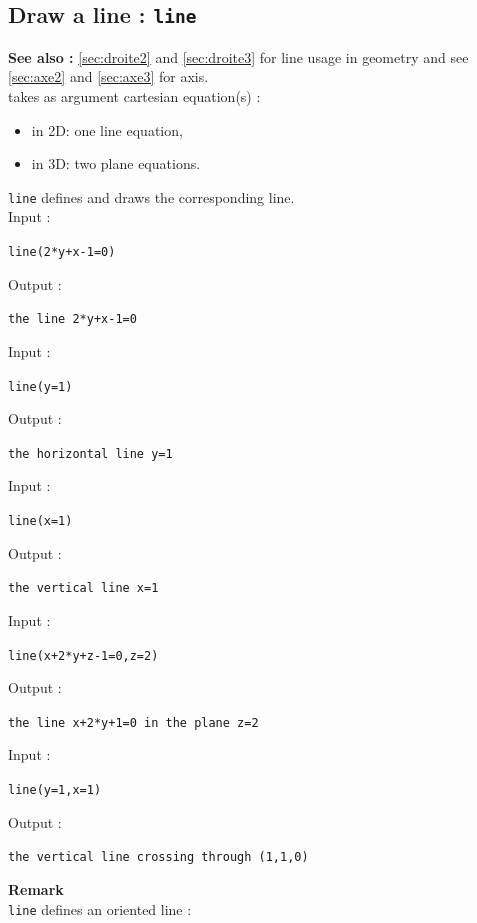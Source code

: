 \documentclass[a4paper,11pt]{book}
\begin{document}
\subsection{Draw a line : {\tt line}}\label{sec:doite}
{\bf See also :} \ref{sec:droite2} and \ref{sec:droite3} for line usage in 
geometry and see \ref{sec:axe2} and \ref{sec:axe3} for axis.\\
 takes as argument cartesian equation(s) :
\begin{itemize}
\item in 2D: one line equation,
\item in 3D: two plane equations.
\end{itemize}
{\tt line} defines and draws the corresponding line.\\
Input :
\begin{center}{\tt line(2*y+x-1=0)}\end{center}
Output :
\begin{center}{\tt the line 2*y+x-1=0}\end{center}
Input :
\begin{center}{\tt line(y=1)}\end{center}
Output :
\begin{center}{\tt the horizontal line y=1}\end{center}
Input :
\begin{center}{\tt line(x=1)}\end{center}
Output :
\begin{center}{\tt the vertical line x=1}\end{center}
Input :
\begin{center}{\tt line(x+2*y+z-1=0,z=2)}\end{center}
Output :
\begin{center}{\tt the line x+2*y+1=0 in the plane z=2}\end{center}
Input :
\begin{center}{\tt line(y=1,x=1)}\end{center}
Output :
\begin{center}{\tt the vertical line crossing through (1,1,0)}\end{center}
{\bf Remark}\\
{\tt line} defines an oriented line :
\end{document}
